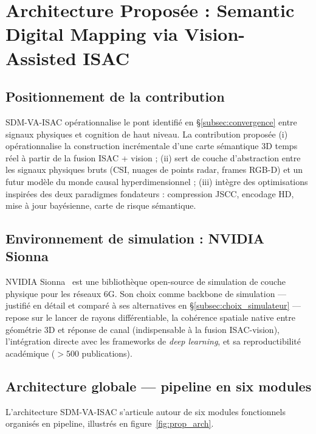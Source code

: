 \documentclass[12pt,a4paper,titlepage]{article}
\begin{document}
\section{Architecture Proposée : Semantic Digital Mapping via Vision-Assisted ISAC}
\label{sec:architecture_proposee}

\subsection{Positionnement de la contribution}

SDM-VA-ISAC opérationnalise le pont identifié en \S\ref{subsec:convergence} entre signaux physiques et cognition de haut niveau. La contribution proposée (i) opérationnalise la construction incrémentale d'une carte sémantique 3D temps réel à partir de la fusion ISAC + vision ; (ii) sert de couche d'abstraction entre les signaux physiques bruts (CSI, nuages de points radar, frames RGB-D) et un futur modèle du monde causal hyperdimensionnel ; (iii) intègre des optimisations inspirées des deux paradigmes fondateurs : compression JSCC, encodage HD, mise à jour bayésienne, carte de risque sémantique.

\subsection{Environnement de simulation : NVIDIA Sionna}

NVIDIA Sionna~\cite{sionna,sionna_rt_2} est une bibliothèque open-source de simulation de couche physique pour les réseaux 6G. Son choix comme backbone de simulation --- justifié en détail et comparé à ses alternatives en \S\ref{subsec:choix_simulateur} --- repose sur le lancer de rayons différentiable, la cohérence spatiale native entre géométrie 3D et réponse de canal (indispensable à la fusion ISAC-vision), l'intégration directe avec les frameworks de \textit{deep learning}, et sa reproductibilité académique ($>500$ publications).

\subsection{Architecture globale --- pipeline en six modules}
\label{subsec:pipeline_six_modules}

L'architecture SDM-VA-ISAC s'articule autour de six modules fonctionnels organisés en pipeline, illustrés en figure~\ref{fig:prop_arch}.
\end{document}
